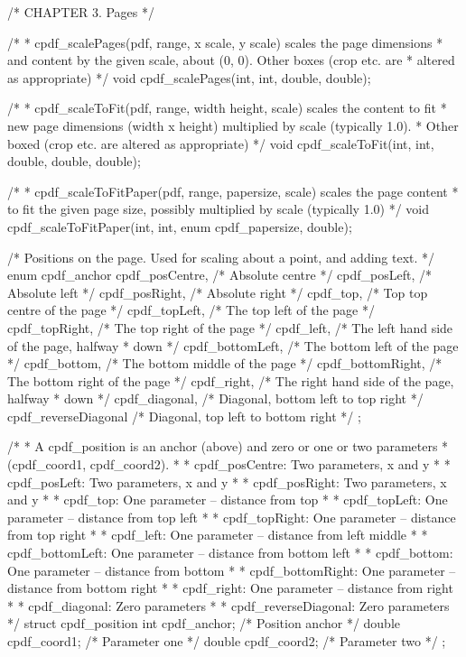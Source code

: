 /* CHAPTER 3. Pages */

/*
 * cpdf_scalePages(pdf, range, x scale, y scale) scales the page dimensions
 * and content by the given scale, about (0, 0). Other boxes (crop etc. are
 * altered as appropriate)
 */
void cpdf_scalePages(int, int, double, double);

/*
 * cpdf_scaleToFit(pdf, range, width height, scale) scales the content to fit
 * new page dimensions (width x height) multiplied by scale (typically 1.0).
 * Other boxed (crop etc. are altered as appropriate)
 */
void cpdf_scaleToFit(int, int, double, double, double);

/*
 * cpdf_scaleToFitPaper(pdf, range, papersize, scale) scales the page content
 * to fit the given page size, possibly multiplied by scale (typically 1.0)
 */
void cpdf_scaleToFitPaper(int, int, enum cpdf_papersize, double);

/* Positions on the page. Used for scaling about a point, and adding text. */
enum cpdf_anchor {
  cpdf_posCentre,      /* Absolute centre */
  cpdf_posLeft,        /* Absolute left */
  cpdf_posRight,       /* Absolute right */
  cpdf_top,            /* Top top centre of the page */
  cpdf_topLeft,        /* The top left of the page */
  cpdf_topRight,       /* The top right of the page */
  cpdf_left,           /* The left hand side of the page, halfway
                        * down */
  cpdf_bottomLeft,     /* The bottom left of the page */
  cpdf_bottom,         /* The bottom middle of the page */
  cpdf_bottomRight,    /* The bottom right of the page */
  cpdf_right,          /* The right hand side of the page, halfway
                        * down */
  cpdf_diagonal,       /* Diagonal, bottom left to top right */
  cpdf_reverseDiagonal /* Diagonal, top left to bottom right */
};

/*
 * A cpdf_position is an anchor (above) and zero or one or two parameters
 * (cpdf_coord1, cpdf_coord2).
 *
 * cpdf_posCentre: Two parameters, x and y
 *
 * cpdf_posLeft: Two parameters, x and y
 *
 * cpdf_posRight: Two parameters, x and y
 *
 * cpdf_top: One parameter -- distance from top
 *
 * cpdf_topLeft: One parameter -- distance from top left
 *
 * cpdf_topRight: One parameter -- distance from top right
 *
 * cpdf_left: One parameter -- distance from left middle
 *
 * cpdf_bottomLeft: One parameter -- distance from bottom left
 *
 * cpdf_bottom: One parameter -- distance from bottom
 *
 * cpdf_bottomRight: One parameter -- distance from bottom right
 *
 * cpdf_right: One parameter -- distance from right
 *
 * cpdf_diagonal: Zero parameters
 *
 * cpdf_reverseDiagonal: Zero parameters
 */
struct cpdf_position {
  int cpdf_anchor;    /* Position anchor */
  double cpdf_coord1; /* Parameter one */
  double cpdf_coord2; /* Parameter two */
};

